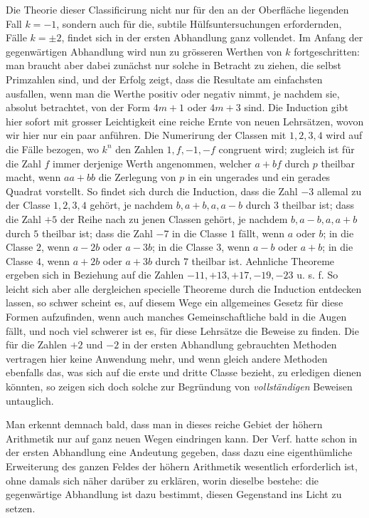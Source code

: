Die Theorie dieser Classificirung nicht nur für den an der Oberfläche liegenden Fall $k=-1$, sondern auch für die, subtile Hülfsuntersuchungen erfordernden, Fälle $k=\pm2$, findet sich in der ersten Abhandlung ganz vollendet. Im Anfang der gegenwärtigen Abhandlung wird nun zu grösseren Werthen von $k$ fortgeschritten: man braucht aber dabei zunächst nur solche in Betracht zu ziehen, die selbst Primzahlen sind, und der Erfolg zeigt, dass die Resultate am einfachsten ausfallen, wenn man die Werthe positiv oder negativ nimmt, je nachdem sie, absolut betrachtet, von der Form $4m+1$ oder $4m+3$ sind. Die Induction gibt hier sofort mit grosser Leichtigkeit eine reiche Ernte von neuen Lehrsätzen, wovon wir hier nur ein paar anführen. Die Numerirung der Classen mit $1,2,3,4$ wird auf die Fälle bezogen, wo $k^n$ den Zahlen $1,f,-1,-f$ congruent wird; zugleich ist für die Zahl $f$ immer derjenige Werth angenommen, welcher $a+bf$ durch $p$ theilbar macht, wenn $aa+bb$ die Zerlegung von $p$ in ein ungerades und ein gerades Quadrat vorstellt. So findet sich durch die Induction, dass die Zahl $-3$ allemal zu der Classe $1,2,3,4$ gehört, je nachdem $b,a+b,a,a-b$ durch $3$ theilbar ist; dass die Zahl $+5$ der Reihe nach zu jenen Classen gehört, je nachdem $b,a-b,a,a+b$ durch $5$ theilbar ist; dass die Zahl $-7$ in die Classe $1$ fällt, wenn $a$ oder $b$; in die Classe $2$, wenn $a-2b$ oder $a-3b$; in die Classe $3$, wenn $a-b$ oder $a+b$; in die Classe $4$, wenn $a+2b$ oder $a+3b$ durch $7$ theilbar ist. Aehnliche Theoreme ergeben sich in Beziehung auf die Zahlen $-11,+13,+17,-19,-23$ u. s. f. So leicht sich aber alle dergleichen specielle Theoreme durch die Induction entdecken lassen, so schwer scheint
%
es, auf diesem Wege ein allgemeines Gesetz für diese Formen aufzufinden, wenn auch manches Gemeinschaftliche bald in die Augen fällt, und noch viel schwerer ist es, für diese Lehrsätze die Beweise zu finden. Die für die Zahlen $+2$ und $-2$ in der ersten Abhandlung gebrauchten Methoden vertragen hier keine Anwendung mehr, und wenn gleich andere Methoden ebenfalls das, was sich auf die erste und dritte Classe bezieht, zu erledigen dienen könnten, so zeigen sich doch solche zur Begründung von \emph{vollständigen} Beweisen untauglich.

Man erkennt demnach bald, dass man in dieses reiche Gebiet der höhern Arithmetik nur auf ganz neuen Wegen eindringen kann. Der Verf. hatte schon in der ersten Abhandlung eine Andeutung gegeben, dass dazu eine eigenthümliche Erweiterung des ganzen Feldes der höhern Arithmetik wesentlich erforderlich ist, ohne damals sich näher darüber zu erklären, worin dieselbe bestehe: die gegenwärtige Abhandlung ist dazu bestimmt, diesen Gegenstand ins Licht zu setzen.

